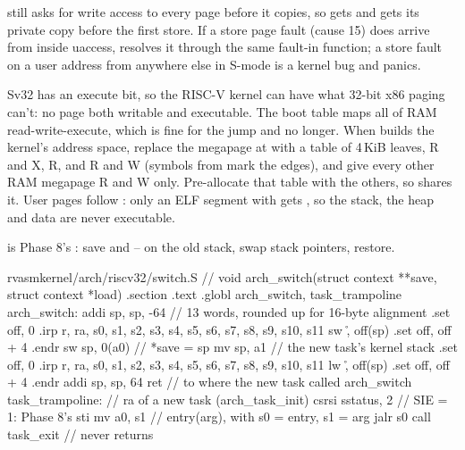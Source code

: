 \documentclass[11pt,a4paper]{article}
\begin{document}
 still asks  for write access to every page before it copies, so
 gets  and  gets its private copy before the first store. If a store page
fault (cause 15) does arrive from inside uaccess,  resolves it through the same fault-in function;
a store fault on a user address from anywhere else in S-mode is a kernel bug and panics.

Sv32 has an execute bit, so the RISC-V kernel can have what 32-bit x86 paging can't: no page both writable and
executable. The boot table maps all of RAM read-write-execute, which is fine for the jump and no longer. When
 builds the kernel's address space, replace the megapage at  with a table of 4\,KiB
leaves,  R and X,  R,  and  R and W (symbols from 
mark the edges), and give every other RAM megapage R and W only. Pre-allocate that table with the others, so
 shares it. User pages follow : only an ELF segment with  gets
, so the stack, the heap and data are never executable.

 is Phase 8's : save  and -- on the old stack,
swap stack pointers, restore.

\begin{lst}{rvasm}{kernel/arch/riscv32/switch.S}
// void arch_switch(struct context **save, struct context *load)
    .section .text
    .globl arch_switch, task_trampoline
arch_switch:
    addi  sp, sp, -64               // 13 words, rounded up for 16-byte alignment
    .set  off, 0
    .irp  r, ra, s0, s1, s2, s3, s4, s5, s6, s7, s8, s9, s10, s11
    sw    \r, off(sp)
    .set  off, off + 4
    .endr
    sw    sp, 0(a0)                 // *save = sp
    mv    sp, a1                    // the new task's kernel stack
    .set  off, 0
    .irp  r, ra, s0, s1, s2, s3, s4, s5, s6, s7, s8, s9, s10, s11
    lw    \r, off(sp)
    .set  off, off + 4
    .endr
    addi  sp, sp, 64
    ret                             // to where the new task called arch_switch
task_trampoline:                    // ra of a new task (arch_task_init)
    csrsi sstatus, 2                // SIE = 1: Phase 8's sti
    mv    a0, s1                    // entry(arg), with s0 = entry, s1 = arg
    jalr  s0
    call  task_exit                 // never returns
\end{lst}
\end{document}
